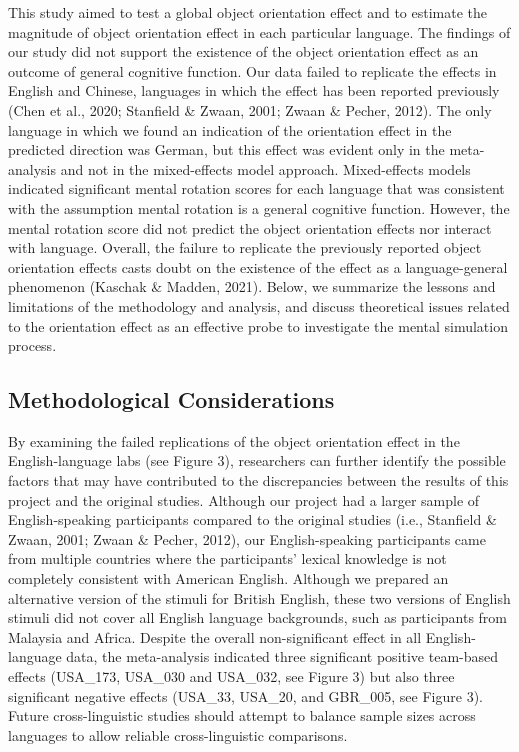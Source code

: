 \documentclass[
  man,floatsintext]{apa7}
\begin{document}
This study aimed to test a global object orientation effect and to
estimate the magnitude of object orientation effect in each particular
language. The findings of our study did not support the existence of the
object orientation effect as an outcome of general cognitive function.
Our data failed to replicate the effects in English and Chinese,
languages in which the effect has been reported previously
(Chen et al., 2020; Stanfield \& Zwaan, 2001; Zwaan \& Pecher, 2012). The only language in which we
found an indication of the orientation effect in the predicted direction
was German, but this effect was evident only in the meta-analysis and
not in the mixed-effects model approach. Mixed-effects models indicated
significant mental rotation scores for each language that was consistent
with the assumption mental rotation is a general cognitive function.
However, the mental rotation score did not predict the object
orientation effects nor interact with language. Overall, the failure to
replicate the previously reported object orientation effects casts doubt
on the existence of the effect as a language-general phenomenon
(Kaschak \& Madden, 2021). Below, we summarize the lessons and
limitations of the methodology and analysis, and discuss theoretical
issues related to the orientation effect as an effective probe to
investigate the mental simulation process.

\hypertarget{methodological-considerations}{%
\subsection{Methodological Considerations}\label{methodological-considerations}}

By examining the failed replications of the object orientation effect in
the English-language labs (see Figure 3), researchers can further
identify the possible factors that may have contributed to the
discrepancies between the results of this project and the original
studies. Although our project had a larger sample of English-speaking
participants compared to the original studies (i.e., Stanfield \& Zwaan, 2001; Zwaan \& Pecher, 2012), our
English-speaking participants came from multiple countries where the
participants' lexical knowledge is not completely consistent with
American English. Although we prepared an alternative version of the
stimuli for British English, these two versions of English stimuli did
not cover all English language backgrounds, such as participants from
Malaysia and Africa. Despite the overall non-significant effect in all
English-language data, the meta-analysis indicated three significant
positive team-based effects (USA\_173, USA\_030 and USA\_032, see Figure 3)
but also three significant negative effects (USA\_33, USA\_20, and
GBR\_005, see Figure 3). Future cross-linguistic studies should attempt
to balance sample sizes across languages to allow reliable
cross-linguistic comparisons.
\end{document}
